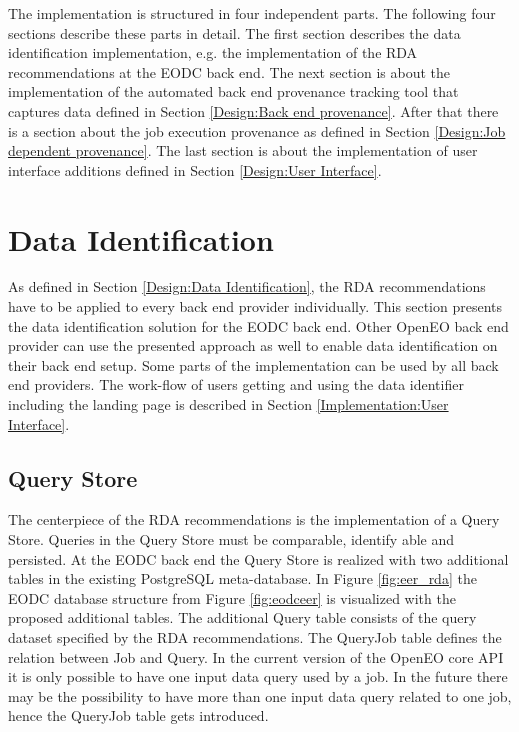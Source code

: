 \documentclass[draft,final]{vutinfth} %
\begin{document}
The implementation is structured in four independent parts. The following four sections describe these parts in detail. The first section describes the data identification implementation, e.g. the implementation of the RDA recommendations at the EODC back end. The next section is about the implementation of the automated back end provenance tracking tool that captures data defined in Section \ref{Design:Back end provenance}. After that there is a section about the job execution provenance as defined in Section \ref{Design:Job dependent provenance}. The last section is about the implementation of user interface additions defined in Section \ref{Design:User Interface}.     

\section{Data Identification}\label{Implementation:Data Identification}

As defined in Section \ref{Design:Data Identification}, the RDA recommendations have to be applied to every back end provider individually. This section presents the data identification solution for the EODC back end. Other OpenEO back end provider can use the presented approach as well to enable data identification on their back end setup. Some parts of the implementation can be used by all back end providers. The work-flow of users getting and using the data identifier including the landing page is described in Section \ref{Implementation:User Interface}. \\

\subsection{Query Store}
The centerpiece of the RDA recommendations is the implementation of a Query Store. Queries in the Query Store must be comparable, identify able and persisted. At the EODC back end the Query Store is realized with two additional tables in the existing PostgreSQL meta-database. In Figure \ref{fig:eer_rda} the EODC database structure from Figure \ref{fig:eodceer} is visualized with the proposed additional tables. The additional Query table consists of the query dataset specified by the RDA recommendations. The QueryJob table defines the relation between Job and Query. In the current version of the OpenEO core API it is only possible to have one input data query used by a job. In the future there may be the possibility to have more than one input data query related to one job, hence the QueryJob table gets introduced. 
\end{document}
